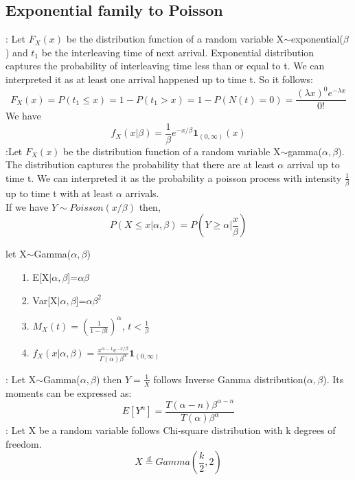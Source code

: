 \documentclass[../Distributions.tex]{subfiles}
\begin{document}
\subsection{Exponential family to Poisson}
: Let $F_X(x)$ be the distribution function of a random variable X$\sim$exponential($\beta$) and $t_1$ be the interleaving time of next arrival. Exponential distribution captures the probability of interleaving time less than or equal to t. We can interpreted it as at least one arrival happened up to time t. So it follows:
$$F_X(x)=P(t_1\leq x)=1-P(t_1>x)=1-P(N(t)=0)=\frac{(\lambda x)^0e^{-\lambda x}}{0!}$$
We have 
$$f_X(x|\beta) = \frac{1}{\beta}e^{-x/\beta}\mathbf{1}_{(0,\infty)}(x)$$
:Let $F_X(x)$ be the distribution function of a random variable X$\sim$gamma($\alpha,\beta$). The distribution captures the probability that there are at least $\alpha$ arrival up to time t. We can interpreted it as the probability a poisson process with intensity $\frac{1}{\beta}$ up to time t with at least $\alpha$ arrivals.\\ If we have $Y\sim Poisson(x/\beta)$ then,
$$P(X\leq x|\alpha,\beta)=P(Y\geq \alpha|\frac{x}{\beta})$$
\begin{property}let X$\sim$Gamma($\alpha,\beta$)
\begin{enumerate}
\item[1.] E[X$\vert\alpha,\beta$]=$\alpha\beta$
\item[2.] Var[X$\vert\alpha,\beta$]=$\alpha\beta^2$
\item[3.] $M_X(t)=(\frac{1}{1-\beta t})^\alpha$, $t<\frac{1}{\beta}$
\item[4.] $f_X(x|\alpha,\beta) = \frac{x^{\alpha-1}e^{-x/\beta}}{\Gamma(\alpha)\beta^\alpha}\mathbf{1}_{(0,\infty)}$
\end{enumerate}
\end{property}
: Let X$\sim$Gamma($\alpha,\beta$) then $Y=\frac{1}{X}$ follows Inverse Gamma distribution($\alpha,\beta$).  Its moments can be expressed as:
$$E[Y^n]=\frac{T(\alpha-n)\beta^{\alpha-n}}{T(\alpha)\beta^\alpha}$$
: Let X be a random variable follows Chi-square distribution with k degrees of freedom.$$X\overset{d}{=}Gamma(\frac{k}{2},2)$$
\end{document}
